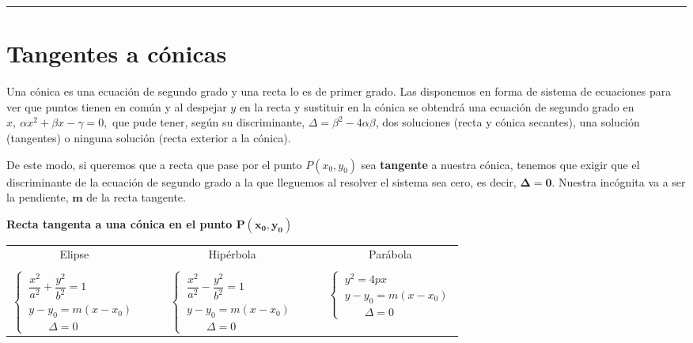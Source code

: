 \vspace{5mm}

\begin{center} \rule{250pt}{0.2pt} \end{center}	


\vspace{1cm}
\section{Tangentes a cónicas}
\vspace{0.5cm}

Una cónica es una ecuación de segundo grado y una recta lo es de primer grado. Las disponemos en forma de sistema de ecuaciones para ver que puntos tienen en común y al despejar $y$ en la recta y sustituir en la cónica se obtendrá una ecuación de segundo grado en $x, \ \alpha x^2+\beta x-\gamma=0, $ que pude tener, según su discriminante, $\Delta=\beta^2-4\alpha \beta$, dos soluciones (recta y cónica secantes), una solución (tangentes) o ninguna solución (recta exterior a la cónica).

De este modo, si queremos que a recta que pase por el punto $P(x_0,y_0)$ sea \textbf{tangente} a nuestra cónica, tenemos que exigir que el discriminante de la ecuación de segundo grado a la que lleguemos al resolver el sistema sea cero, es decir, $\boldsymbol{\Delta=0}$. Nuestra incógnita va a ser la pendiente, $\boldsymbol{m}$ de la recta tangente.

\vspace{5mm}
\textbf{Recta tangenta a una cónica en el punto $\boldsymbol{P(x_0,y_0)}$}
\begin{table}[H]
\centering
\begin{tabular}{ccccc}
Elipse & $\quad$ & Hipérbola & $\quad$ & Parábola \\ \cline{1-1} \cline{3-3} \cline{5-5}  \\
$ \begin{cases} \ \dfrac{x^2}{a^2}+\dfrac{y^2}{b^2}=1 \\ \ y-y_0=m(x-x_0)  \\ \qquad \Delta=0 \end{cases}$ &         & $ \begin{cases} \ \dfrac{x^2}{a^2}-\dfrac{y^2}{b^2}=1 \\ \ y-y_0=m(x-x_0) \\ \qquad \Delta=0 \end{cases}$ &         & $ \begin{cases} \ y^2=4px \\ \ y-y_0=m(x-x_0) \\ \qquad \Delta=0 \end{cases}$
\end{tabular}
\end{table}

